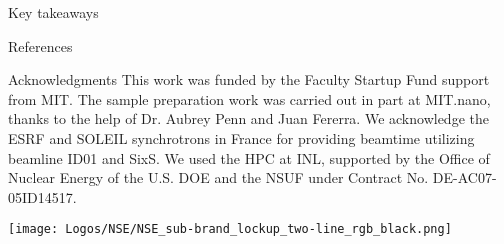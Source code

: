 \begin{column}{\colwidth}
\begin{alertblock}{Key takeaways}

    \end{alertblock}

    \begin{block}{References}
        \nocite{*}
        \footnotesize{}
    \end{block}

    \begin{block}{Acknowledgments}
        \centering
        \footnotesize{
            This work was funded by the Faculty Startup Fund support from MIT.
            The sample preparation work was carried out in part at MIT.nano, thanks to the help of Dr. Aubrey Penn and Juan Fererra.
            We acknowledge the ESRF and SOLEIL synchrotrons in France for providing beamtime utilizing beamline ID01 and SixS.
            We used the HPC at INL, supported by the Office of Nuclear Energy of the U.S. DOE and the NSUF under Contract No. DE-AC07-05ID14517.
        }

        \bigskip

        \texttt{[image: Logos/NSE/NSE\_sub-brand\_lockup\_two-line\_rgb\_black.png]}

    \end{block}

\end{column}

\separatorcolumn